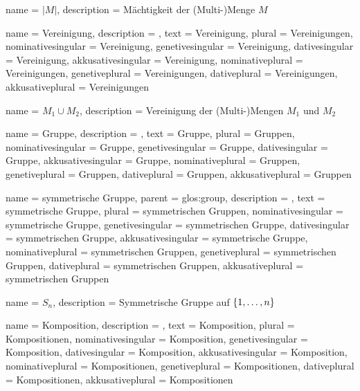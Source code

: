 {
    name        = {$|M|$},
    description = {Mächtigkeit der (Multi-)Menge $M$}
}

{
    name               = {Vereinigung},
    description        = {},
    text               = {Vereinigung},
    plural             = {Vereinigungen},
    nominativesingular = {Vereinigung},
    genetivesingular   = {Vereinigung},
    dativesingular     = {Vereinigung},
    akkusativesingular = {Vereinigung},
    nominativeplural   = {Vereinigungen},
    genetiveplural     = {Vereinigungen},
    dativeplural       = {Vereinigungen},
    akkusativeplural   = {Vereinigungen}
}

{
    name        = {$M_1 \cup M_2$},
    description = {Vereinigung der (Multi-)Mengen $M_1$ und $M_2$}
}

{
    name               = {Gruppe},
    description        = {},
    text               = {Gruppe},
    plural             = {Gruppen},
    nominativesingular = {Gruppe},
    genetivesingular   = {Gruppe},
    dativesingular     = {Gruppe},
    akkusativesingular = {Gruppe},
    nominativeplural   = {Gruppen},
    genetiveplural     = {Gruppen},
    dativeplural       = {Gruppen},
    akkusativeplural   = {Gruppen}
}

{
    name               = {symmetrische Gruppe},
    parent             = {glos:group},
    description        = {},
    text               = {symmetrische Gruppe},
    plural             = {symmetrischen Gruppen},
    nominativesingular = {symmetrische Gruppe},
    genetivesingular   = {symmetrischen Gruppe},
    dativesingular     = {symmetrischen Gruppe},
    akkusativesingular = {symmetrische Gruppe},
    nominativeplural   = {symmetrischen Gruppen},
    genetiveplural     = {symmetrischen Gruppen},
    dativeplural       = {symmetrischen Gruppen},
    akkusativeplural   = {symmetrischen Gruppen}
}

{
    name        = {$S_n$},
    description = {Symmetrische Gruppe auf ${\left \{ 1, \dots, n \right \}}$}
}

{
    name               = {Komposition},
    description        = {},
    text               = {Komposition},
    plural             = {Kompositionen},
    nominativesingular = {Komposition},
    genetivesingular   = {Komposition},
    dativesingular     = {Komposition},
    akkusativesingular = {Komposition},
    nominativeplural   = {Kompositionen},
    genetiveplural     = {Kompositionen},
    dativeplural       = {Kompositionen},
    akkusativeplural   = {Kompositionen}
}

